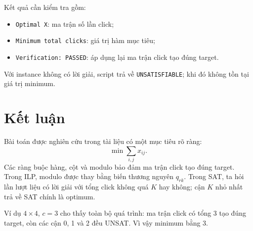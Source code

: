 \documentclass[11pt,a4paper]{article}
\begin{document}
Kết quả cần kiểm tra gồm:

\begin{itemize}
  \item \texttt{Optimal X}: ma trận số lần click;
  \item \texttt{Minimum total clicks}: giá trị hàm mục tiêu;
  \item \texttt{Verification: PASSED}: áp dụng lại ma trận click tạo đúng
        target.
\end{itemize}

Với instance không có lời giải, script trả về
\texttt{UNSATISFIABLE}; khi đó không tồn tại giá trị minimum.

\section{Kết luận}\label{sec:conclusion}

Bài toán được nghiên cứu trong tài liệu có một mục tiêu rõ ràng:
\[
  \min\sum_{i,j}x_{ij}.
\]
Các ràng buộc hàng, cột và modulo bảo đảm ma trận click tạo đúng target.
Trong ILP, modulo được thay bằng biến thương nguyên $q_{rk}$. Trong SAT,
ta hỏi lần lượt liệu có lời giải với tổng click không quá $K$ hay không;
cận $K$ nhỏ nhất trả về SAT chính là optimum.

Ví dụ $4\times4$, $c=3$ cho thấy toàn bộ quá trình: ma trận click có tổng
3 tạo đúng target, còn các cận 0, 1 và 2 đều UNSAT. Vì vậy minimum bằng 3.

\clearpage


\end{document}
